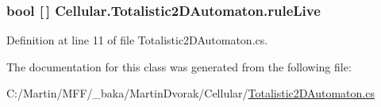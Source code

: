 \subsubsection[{rule\+Live}]{\setlength{\rightskip}{0pt plus 5cm}bool \mbox{[}$\,$\mbox{]} Cellular.\+Totalistic2\+D\+Automaton.\+rule\+Live\hspace{0.3cm}{\ttfamily [protected]}}\label{class_cellular_1_1_totalistic2_d_automaton_a4752e3402c58243f7f342e21ddad3b05}


Definition at line 11 of file Totalistic2\+D\+Automaton.\+cs.



The documentation for this class was generated from the following file\+:\begin{DoxyCompactItemize}
\item 
C\+:/\+Martin/\+M\+F\+F/\+\_\+baka/\+Martin\+Dvorak/\+Cellular/\hyperlink{_totalistic2_d_automaton_8cs}{Totalistic2\+D\+Automaton.\+cs}\end{DoxyCompactItemize}

